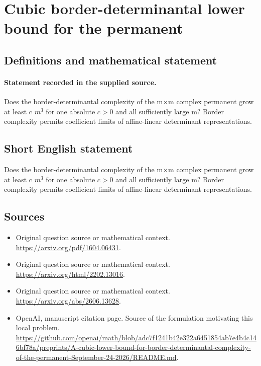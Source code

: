 \documentclass[11pt]{article}
\begin{document}
\section*{Cubic border-determinantal lower bound for the permanent}\label{30007475}
\subsection{Definitions and mathematical statement}
\paragraph{Statement recorded in the supplied source.}
Does the border-determinantal complexity of the m×m complex permanent grow at least c $m^{3}$ for one absolute $c>0$ and all sufficiently large m? Border complexity permits coefficient limits of affine-linear determinant representations.
\subsection{Short English statement}
Does the border-determinantal complexity of the m×m complex permanent grow at least c $m^{3}$ for one absolute $c>0$ and all sufficiently large m? Border complexity permits coefficient limits of affine-linear determinant representations.
\subsection{Sources}
\begin{itemize}
\item[S1] Original question source or mathematical context.
\url{https://arxiv.org/pdf/1604.06431}.
\item[S2] Original question source or mathematical context.
\url{https://arxiv.org/html/2202.13016}.
\item[S3] Original question source or mathematical context.
\url{https://arxiv.org/abs/2606.13628}.
\item[S4] OpenAI, manuscript citation page. Source of the formulation motivating this local problem.
\url{https://github.com/openai/math/blob/adc7f1241b42e322a6451854ab7e4b4c146bf78a/preprints/A-cubic-lower-bound-for-border-determinantal-complexity-of-the-permanent-September-24-2026/README.md}.
\end{itemize}
\end{document}
